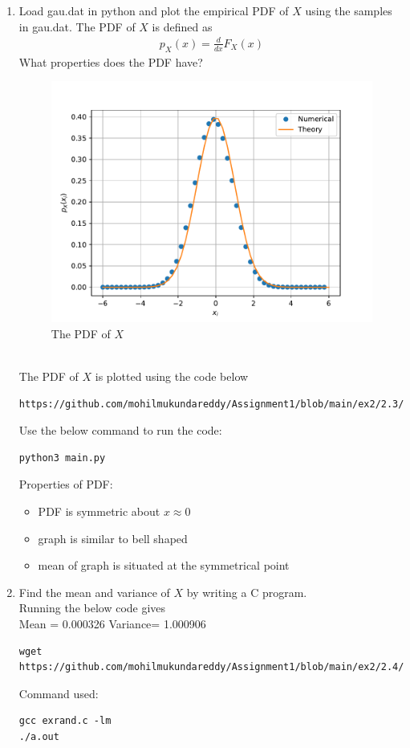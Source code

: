 \documentclass[journal,12pt,twocolumn]{IEEEtran}
\renewcommand\thesection{\arabic{section}}
\begin{document}
\begin{enumerate}[label=\thesection.\arabic*,ref=\thesection.\theenumi]
\item
Load gau.dat in python and plot the empirical PDF of $X$ using the samples in gau.dat. The PDF of $X$ is defined as
\begin{align}
p_{X}(x) = \frac{d}{dx}F_{X}(x)
\end{align}
What properties does the PDF have?
\\
\begin{figure}[H]
\centering
\includegraphics[width=\columnwidth]{gauss_pdf.pdf}
\caption{The PDF of $X$}
\label{fig:gauss_pdf}
\end{figure}
\\
\solution The PDF of $X$ is plotted  using the code below
\begin{lstlisting}
https://github.com/mohilmukundareddy/Assignment1/blob/main/ex2/2.3/main.py
\end{lstlisting}
Use the below command to run the code:
\begin{lstlisting}
python3 main.py
\end{lstlisting}
Properties of PDF:
\begin{itemize}
\item PDF is symmetric about $x \approx 0$\\
\item graph is similar to bell shaped\\
\item mean of graph is situated at the symmetrical point\\
\end{itemize}

\item Find the mean and variance of $X$ by writing a C program.\\
\solution
Running the below code gives \\
Mean = 0.000326
Variance= 1.000906
 \begin{lstlisting}
wget https://github.com/mohilmukundareddy/Assignment1/blob/main/ex2/2.4/exrand.c
\end{lstlisting}
Command used:
\begin{lstlisting}
gcc exrand.c -lm
./a.out
\end{lstlisting}


\end{enumerate}
\end{document}
